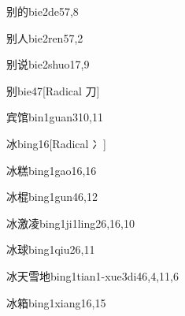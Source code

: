 \begin{verbete}{别的}{bie2de5}{7,8}
\end{verbete}

\begin{verbete}{别人}{bie2ren5}{7,2}
\end{verbete}

\begin{verbete}{别说}{bie2shuo1}{7,9}
\end{verbete}

\begin{verbete}{别}{bie4}{7}[Radical 刀]
\end{verbete}

\begin{verbete}{宾馆}{bin1guan3}{10,11}
\end{verbete}

\begin{verbete}{冰}{bing1}{6}[Radical 冫]
\end{verbete}

\begin{verbete}{冰糕}{bing1gao1}{6,16}
\end{verbete}

\begin{verbete}{冰棍}{bing1gun4}{6,12}
\end{verbete}

\begin{verbete}{冰激凌}{bing1ji1ling2}{6,16,10}
\end{verbete}

\begin{verbete}{冰球}{bing1qiu2}{6,11}
\end{verbete}

\begin{verbete}{冰天雪地}{bing1tian1-xue3di4}{6,4,11,6}
\end{verbete}

\begin{verbete}{冰箱}{bing1xiang1}{6,15}
\end{verbete}


